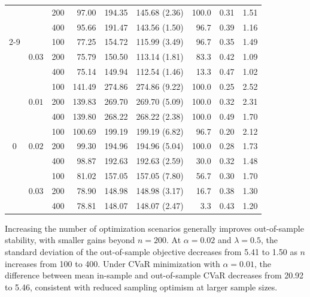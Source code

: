 \documentclass{itor}
\begin{document}
\begin{table}[!htbp]
\begin{tabular}{@{}ccc r r r r r r@{}}
 &  & 200 & 97.00 & 194.35 & 145.68 (2.36) & 100.0 & 0.31 & 1.51 \\
 &  & 400 & 95.66 & 191.47 & 143.56 (1.50) & 96.7 & 0.39 & 1.16 \\
\cmidrule(l){2-9}
 & \multirow{3}{*}{$0.03$} & 100 & 77.25 & 154.72 & 115.99 (3.49) & 96.7 & 0.35 & 1.49 \\
 &  & 200 & 75.79 & 150.50 & 113.14 (1.81) & 83.3 & 0.42 & 1.09 \\
 &  & 400 & 75.14 & 149.94 & 112.54 (1.46) & 13.3 & 0.47 & 1.02 \\
\midrule
\multirow{9}{*}{$0$} & \multirow{3}{*}{$0.01$} & 100 & 141.49 & 274.86 & 274.86 (9.22) & 100.0 & 0.25 & 2.52 \\
 &  & 200 & 139.83 & 269.70 & 269.70 (5.09) & 100.0 & 0.32 & 2.31 \\
 &  & 400 & 139.80 & 268.22 & 268.22 (2.38) & 100.0 & 0.49 & 1.70 \\
\cmidrule(l){2-9}
 & \multirow{3}{*}{$0.02$} & 100 & 100.69 & 199.19 & 199.19 (6.82) & 96.7 & 0.20 & 2.12 \\
 &  & 200 & 99.30 & 194.96 & 194.96 (5.04) & 100.0 & 0.28 & 1.73 \\
 &  & 400 & 98.87 & 192.63 & 192.63 (2.59) & 30.0 & 0.32 & 1.48 \\
\cmidrule(l){2-9}
 & \multirow{3}{*}{$0.03$} & 100 & 81.02 & 157.05 & 157.05 (7.80) & 56.7 & 0.30 & 1.70 \\
 &  & 200 & 78.90 & 148.98 & 148.98 (3.17) & 16.7 & 0.38 & 1.30 \\
 &  & 400 & 78.81 & 148.07 & 148.07 (2.47) & 3.3 & 0.43 & 1.20 \\
\bottomrule
\end{tabular}
\end{table}

Increasing the number of optimization scenarios generally improves
out-of-sample stability, with smaller gains beyond $n=200$.
At $\alpha=0.02$ and $\lambda=0.5$, the standard deviation of
the out-of-sample objective decreases from 5.41 to 1.50 as
$n$ increases from 100 to 400. Under CVaR minimization with
$\alpha=0.01$, the difference between mean in-sample and
out-of-sample CVaR decreases from 20.92 to 5.46, consistent
with reduced sampling optimism at larger sample sizes.
\end{document}
